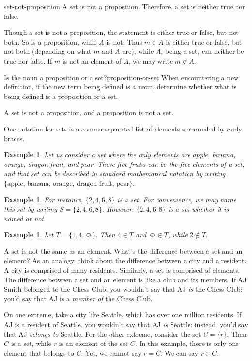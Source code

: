 \documentclass{book}
\newcounter{ekcounter}%
\theoremstyle{ekimcustom}
\newtheorem{example}[ekcounter]{Example}
\begin{document}
\begin{bwarning}{}{set-not-proposition}
A set is not a proposition. Therefore, a set is neither true nor false.
\end{bwarning}
Though a set is not a proposition, the statement  is either true or false, but not both. So  is a proposition, while $A$ is not. Thus $m \in A$ is either true or false, but not both (depending on what $m$ and $A$ are), while $A$, being a set, can neither be true nor false. If $m$ is not an element of $A$, we may write $m \not\in A$.
\begin{bhabit}{Is the noun a proposition or a set?}{proposition-or-set}
When encountering a new definition, if the new term being defined is a noun, determine whether what is being defined is a proposition or a set.
\end{bhabit}
A set is not a proposition, and a proposition is not a set.

One notation for sets is a comma-separated list of elements surrounded by curly braces.
\begin{example}
Let us consider a set where the only elements are apple, banana, orange, dragon fruit, and pear. These five fruits can be the five elements of a set, and that set can be described in standard mathematical notation by writing $\{\text{apple, banana, orange, dragon fruit, pear}\}$.
\end{example}
\begin{example}
For instance, $\{2,4,6,8\}$ is a set. For convenience, we may name this set by writing $S = \{2,4,6,8\}$. However, $\{2,4,6,8\}$ is a set whether it is named or not.
\end{example}
\begin{example}
Let $T = \{1,4,\smiley\}$. Then $4 \in T$ and $\smiley \in T$, while $2 \not\in T$.
\end{example}

A set is not the same as an element. What's the difference between a set and an element? As an analogy, think about the difference between a city and a resident. A city is comprised of many residents. Similarly, a set is comprised of elements. The difference between a set and an element is like a club and its members. If AJ Smith belonged to the Chess Club, you wouldn't say that AJ \emph{is} the Chess Club: you'd say that AJ is a \emph{member of} the Chess Club.

On one extreme, take a city like Seattle, which has over one million residents. If AJ is a resident of Seattle, you wouldn't say that AJ \emph{is} Seattle: instead, you'd say that AJ \emph{belongs to} Seattle. For the other extreme, consider the set $C = \{r\}$. Then $C$ is a set, while $r$ is an element of the set $C$. In this example, there is only one element that belongs to $C$. Yet, we cannot say $r=C$. We can say $r \in C$.
\end{document}
